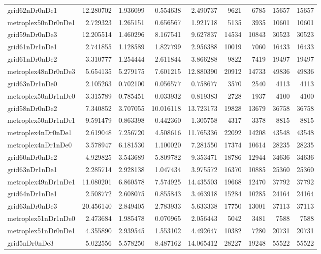 \begin{longtable}{|l|r|r|r|r|r|r|r|r|}
grid62nDr0nDe1 & 12.280702 & 1.936099 & 0.554638 & 2.490737 & 9621 & 6785 & 15657 & 15657 \\
metroplex50nDr0nDe1 & 2.729323 & 1.265151 & 0.656567 & 1.921718 & 5135 & 3935 & 10601 & 10601 \\
grid59nDr0nDe3 & 12.205514 & 1.460296 & 8.167541 & 9.627837 & 14534 & 10843 & 30523 & 30523 \\
grid61nDr1nDe1 & 2.741855 & 1.128589 & 1.827799 & 2.956388 & 10019 & 7060 & 16433 & 16433 \\
grid61nDr0nDe2 & 3.310777 & 1.254444 & 2.611844 & 3.866288 & 9822 & 7419 & 19497 & 19497 \\
metroplex48nDr0nDe3 & 5.654135 & 5.279175 & 7.601215 & 12.880390 & 20912 & 14733 & 49836 & 49836 \\
grid63nDr1nDe0 & 2.105263 & 0.702100 & 0.056577 & 0.758677 & 3570 & 2540 & 4113 & 4113 \\
metroplex50nDr1nDe0 & 3.315789 & 0.785451 & 0.033932 & 0.819383 & 2728 & 1937 & 4100 & 4100 \\
grid58nDr0nDe2 & 7.340852 & 3.707055 & 10.016118 & 13.723173 & 19828 & 13679 & 36758 & 36758 \\
metroplex50nDr1nDe1 & 9.591479 & 0.863398 & 0.442360 & 1.305758 & 4317 & 3378 & 8815 & 8815 \\
metroplex4nDr0nDe1 & 2.619048 & 7.256720 & 4.508616 & 11.765336 & 22092 & 14208 & 43548 & 43548 \\
metroplex4nDr1nDe0 & 3.578947 & 6.181530 & 1.100020 & 7.281550 & 17374 & 10614 & 28235 & 28235 \\
grid60nDr0nDe2 & 4.929825 & 3.543689 & 5.809782 & 9.353471 & 18786 & 12944 & 34636 & 34636 \\
grid63nDr1nDe1 & 2.285714 & 2.928138 & 1.047434 & 3.975572 & 16370 & 10885 & 25360 & 25360 \\
metroplex49nDr1nDe1 & 11.080201 & 6.860578 & 7.574925 & 14.435503 & 19668 & 12470 & 37792 & 37792 \\
grid64nDr1nDe1 & 2.508772 & 2.608075 & 0.855843 & 3.463918 & 15284 & 10285 & 24164 & 24164 \\
grid63nDr0nDe3 & 20.456140 & 2.849405 & 2.783933 & 5.633338 & 17750 & 13001 & 37113 & 37113 \\
metroplex51nDr1nDe0 & 2.473684 & 1.985478 & 0.070965 & 2.056443 & 5042 & 3481 & 7588 & 7588 \\
metroplex51nDr0nDe1 & 4.355890 & 2.939545 & 1.553102 & 4.492647 & 10382 & 7280 & 20731 & 20731 \\
grid5nDr0nDe3 & 5.022556 & 5.578250 & 8.487162 & 14.065412 & 28227 & 19248 & 55522 & 55522 \\

\end{longtable}

